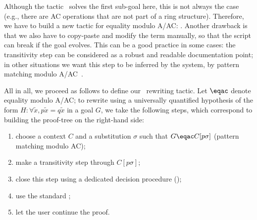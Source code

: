 \documentclass{llncs}
\begin{document}
\noindent
Although the  tactic~\cite{gregoire-mahboubi-05} solves the
first sub-goal here, this is not always the case (e.g., there are AC
operations that are not part of a ring structure). Therefore, we have
to build a new tactic for equality modulo A/AC: \tac.
Another drawback is that we also have to copy-paste and modify the
term manually, so that the script can break if the goal evolves. This
can be a good practice in some cases: the transitivity step can be
considered as a robust and readable documentation point; in other
situations we want this step to be inferred by the system, by pattern
matching modulo A/AC~\cite{hullot}.

All in all, we proceed as follows to define our \aacrewrite\ rewriting
tactic. Let $\eqac$ denote equality modulo A/AC; to rewrite using a
universally quantified hypothesis of the form $H\!: \forall \tilde{x},
p\tilde{x} = q\tilde{x}$ in a goal $G$, we take the following steps,
which correspond to building the proof-tree on the right-hand side:

\noindent
\begin{minipage}[t]{.55\linewidth}
\begin{enumerate}
\item \label{match-unif}choose a context $C$ and a substitution
  $\sigma$ such that $G \eqac C[p\sigma]$ (pattern matching modulo
  AC);
\item \label{make-trans}make a transitivity step through $C[p\sigma]$;
\item \label{close-dp} close this step using a dedicated
  decision procedure (\tac);
\item \label{rewrite}  use the standard \rewrite;
\item \label{continue} let the user continue the proof.
\end{enumerate}
\end{minipage}
\begin{minipage}[t]{.44\linewidth}
\begin{mathpar}
\end{mathpar}
\end{minipage}
\medskip
\end{document}
